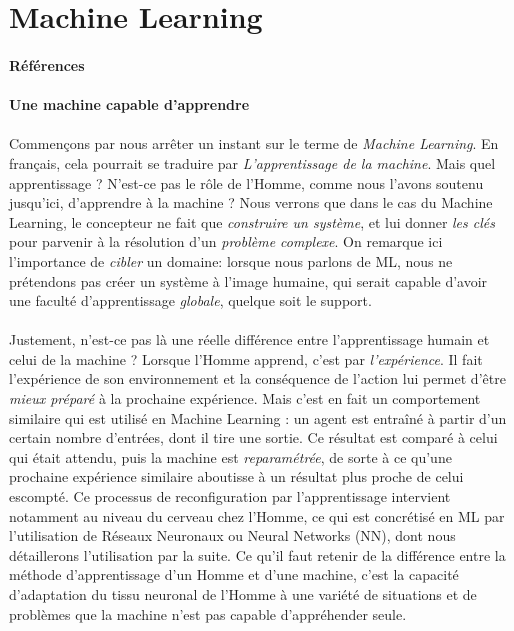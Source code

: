 \section{Machine Learning}
\paragraph{Références} \cite{AlphaGo0} \cite{AlphaGo1} \cite{AlphaGo2} \cite{Heuristics0} \cite{Internet3}
\cite{Internet4} \cite{Internet5} \cite{Internet6} \cite{Internet7} \cite{MachineLearning0} \cite{University0}

\paragraph{Une machine capable d'apprendre}

\paragraph{} Commençons par nous arrêter un instant sur le terme de \emph{Machine Learning}. En français,
cela pourrait se traduire par \emph{L'apprentissage de la machine}. Mais quel apprentissage ? N'est-ce pas
le rôle de l'Homme, comme nous l'avons soutenu jusqu'ici, d'apprendre à la machine ? Nous verrons que dans
le cas du Machine Learning, le concepteur ne fait que \emph{construire un système}, et lui donner
\emph{les clés} pour parvenir à la résolution d'un \emph{problème complexe}. On remarque ici l'importance
de \emph{cibler} un domaine: lorsque nous parlons de ML, nous ne prétendons pas créer un système à l'image
humaine, qui serait capable d'avoir une faculté d'apprentissage \emph{globale}, quelque soit le support. 

\paragraph{} Justement, n'est-ce pas là une réelle différence entre l'apprentissage humain et celui de la machine ?
Lorsque l'Homme apprend, c'est par \emph{l'expérience}. Il fait l'expérience de son environnement et la
conséquence de l'action lui permet d'être \emph{mieux préparé} à la prochaine expérience. Mais c'est en fait un
comportement similaire qui est utilisé en Machine Learning : un agent est entraîné à partir d'un certain nombre
d'entrées, dont il tire une sortie. Ce résultat est comparé à celui qui était attendu, puis la machine est
\emph{reparamétrée}, de sorte à ce qu'une prochaine expérience similaire aboutisse à un résultat plus proche 
de celui escompté. Ce processus de reconfiguration par l'apprentissage intervient notamment au niveau du cerveau
chez l'Homme, ce qui est concrétisé en ML par l'utilisation de Réseaux Neuronaux ou Neural Networks (NN), dont
nous détaillerons l'utilisation par la suite. Ce qu'il faut retenir de la différence entre la méthode d'apprentissage
d'un Homme et d'une machine, c'est la capacité d'adaptation du tissu neuronal de l'Homme à une variété de situations
et de problèmes que la machine n'est pas capable d'appréhender seule.

